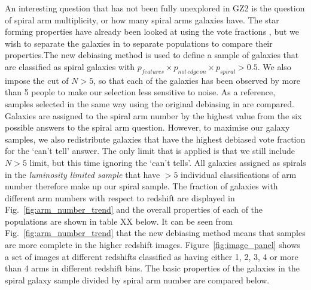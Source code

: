 \documentclass[useAMS,usenatbib]{mn2e}
\begin{document}
An interesting question that has not been fully unexplored in GZ2 is the question of spiral arm multiplicity, or how many spiral arms galaxies have. The star forming properties have already been looked at using the vote fractions \citep{Willett_15}, but we wish to separate the galaxies in to separate populations to compare their properties.The new debiasing method is used to define a sample of galaxies that are classified as spiral galaxies with $p_{features} \times p_{not \, edge \, on} \times p_{spiral} > 0.5$. We also impose the cut of $N>5$, so that each of the galaxies has been observed by more than 5 people to make our selection less sensitive to noise. As a reference, samples selected in the same way using the original debiasing in \citet{Willett_13} are compared. Galaxies are assigned to the spiral arm number by the highest value from the six possible answers to the spiral arm question. However, to maximise our galaxy samples, we also redistribute galaxies that have the highest debiased vote fraction for the `can't tell' answer. The only limit that is applied is that we still include $N>5$ limit, but this time ignoring the `can't tells'. All galaxies assigned as spirals in the \textit{luminosity limited sample} that have $>5$ individual classifications of arm number therefore make up our spiral sample. The fraction of galaxies with different arm numbers with respect to redshift are displayed in Fig.~\ref{fig:arm_number_trend} and the overall properties of each of the populations are shown in table XX below. It can be seen from Fig.~\ref{fig:arm_number_trend} that the new debiasing method means that samples are more complete in the higher redshift images. Figure~\ref{fig:image_panel} shows a set of images at different redshifts classified as having either 1, 2, 3, 4 or more than 4 arms in different redshift bins. The basic properties of the galaxies in the spiral galaxy sample divided by spiral arm number are compared below.
\end{document}
